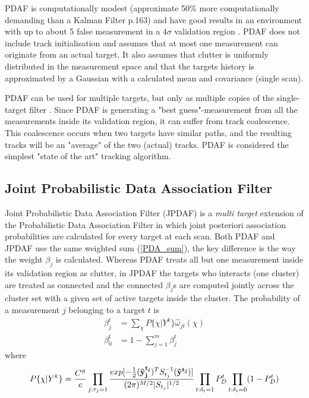 PDAF is computationally modest (approximate 50\% more computationally demanding than a Kalman Filter \cite{Bar-Shalom1988} p.163) and have good results in an environment with up to about 5 false measurement in a $4\sigma$ validation region \cite{Bar-Shalom1988}. PDAF does not include track initialisation and assumes that at most one measurement can originate from an actual target. It also assumes that clutter is uniformly distributed in the measurement space and that the targets history is approximated by a Gaussian with a calculated mean and covariance (single scan).

PDAF can be used for multiple targets, but only as multiple copies of the single-target filter \cite{Fortmann1983}. Since PDAF is generating a "best guess"-measurement from all the measurements inside its validation region, it can suffer from track coalescence. This coalescence occurs when two targets have similar paths, and the resulting tracks will be an "average" of the two (actual) tracks.
PDAF is considered the simplest "state of the art" tracking algorithm.%


\subsection{Joint Probabilistic Data Association Filter}
Joint Probabilistic Data Association Filter (JPDAF) is a \emph{multi target} extension of the Probabilistic Data Association Filter in which joint posteriori association probabilities are calculated for every target at each scan. Both PDAF and JPDAF use the same weighted sum (\ref{PDA_sum}), the key difference is the way the weight $ \beta_j $ is calculated. Whereas PDAF treats all but one measurement inside its validation region as clutter, in JPDAF the targets who interacts (one cluster) are treated as connected and the connected $ \beta_j $s are computed jointly across the cluster set with a given set of active targets inside the cluster. The probability of a measurement $j$ belonging to a target
$ t $ is \cite{Fortmann1983}
\begin{equation}
\begin{split}
\beta_j^t &= \sum_{\chi} P\{ \chi | Y^k \} \hat{\omega}_{jt}(\chi) \\
\beta_0^t &= 1 - \sum_{j=1}^m \beta_j^t
\end{split}
\end{equation}
where
\begin{equation}
P\{\chi|Y^k\} = \frac{C^\phi}{c} 
				\prod_{j:\tau_j=1} \frac{exp[-\frac{1}{2}(\boldsymbol{\mathbf{\tilde{y}_j^{t_j}}})^T S_{t_j}^{-1}(\boldsymbol{\mathbf{\tilde{y}^{t_j}}})]}{(2\pi)^{M/2} |S_{t_j}|^{1/2}}
				\prod_{t:\delta_t=1} P_D^t
				\prod_{t:\delta_t=0} (1 - P_D^t)
\end{equation}

